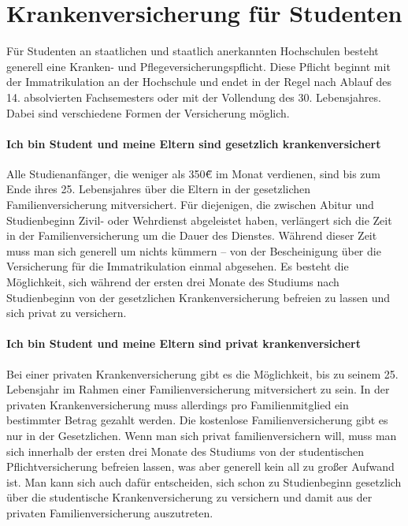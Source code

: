 ﻿\section{Krankenversicherung für Studenten}

Für Studenten an staatlichen und staatlich anerkannten Hochschulen
besteht generell eine Kranken- und Pflegeversicherungspflicht. Diese
Pflicht beginnt mit der Immatrikulation an der Hochschule und endet in
der Regel nach Ablauf des 14. absolvierten Fachsemesters oder mit der
Vollendung des 30. Lebensjahres. Dabei sind verschiedene Formen der
Versicherung möglich.

\paragraph{Ich bin Student und meine Eltern sind gesetzlich krankenversichert}

Alle Studienanfänger, die weniger als 350\~€ im Monat verdienen, sind
bis zum Ende ihres 25. Lebensjahres über die Eltern in der
gesetzlichen Familienversicherung mitversichert. Für diejenigen, die
zwischen Abitur und Studienbeginn Zivil- oder Wehrdienst abgeleistet
haben, verlängert sich die Zeit in der Familienversicherung um die
Dauer des Dienstes. Während dieser Zeit muss man sich generell um
nichts kümmern – von der Bescheinigung über die Versicherung für die
Immatrikulation einmal abgesehen. Es besteht die Möglichkeit, sich
während der ersten drei Monate des Studiums nach Studienbeginn von der
gesetzlichen Krankenversicherung befreien zu lassen und sich privat zu
versichern.

\paragraph{Ich bin Student und meine Eltern sind privat krankenversichert}

Bei einer privaten Krankenversicherung gibt es die Möglichkeit, bis zu
seinem 25. Lebensjahr im Rahmen einer Familienversicherung
mitversichert zu sein. In der privaten Krankenversicherung muss
allerdings pro Familienmitglied ein bestimmter Betrag gezahlt
werden. Die kostenlose Familienversicherung gibt es nur in der
Gesetzlichen. Wenn man sich privat familienversichern will, muss man
sich innerhalb der ersten drei Monate des Studiums von der
studentischen Pflichtversicherung befreien lassen, was aber generell
kein all zu großer Aufwand ist. Man kann sich auch dafür entscheiden,
sich schon zu Studienbeginn gesetzlich über die studentische
Krankenversicherung zu versichern und damit aus der privaten
Familienversicherung auszutreten.

